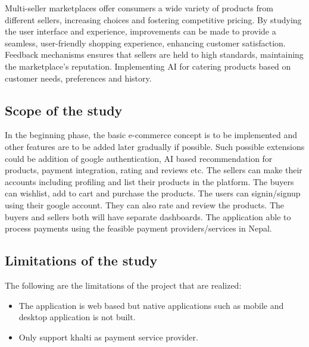 \documentclass[12pt, a4paper, oneside]{article}
\begin{document}
Multi-seller marketplaces offer consumers a wide variety of products from different sellers, increasing choices and fostering competitive pricing. By studying the user interface and experience, improvements can be made to provide a seamless, user-friendly shopping experience, enhancing customer satisfaction. Feedback mechanisms ensures that sellers are held to high standards, maintaining the marketplace’s reputation. Implementing AI for catering products based on customer needs, preferences and history.

\pagebreak
\subsection{Scope of the study}
In the beginning phase, the basic e-commerce concept is to be implemented and other features are to be added later gradually if possible. Such possible extensions could be addition of google authentication, AI based recommendation for products, payment integration, rating and reviews etc. The sellers can make their accounts including profiling and list their products in the platform. The buyers can wishlist, add to cart and purchase the products. The users can signin/signup using their google account. They can also rate and review the products. The buyers and sellers both will have separate dashboards. The application able to process payments using the feasible payment providers/services in Nepal.

\pagebreak
\subsection{Limitations of the study}
The following are the limitations of the project that are realized:
\begin{itemize}
 	\item The application is web based but native applications such as mobile and desktop application is not built.
\item Only support khalti as payment service provider.

 \end{itemize}
\pagebreak
\end{document}
